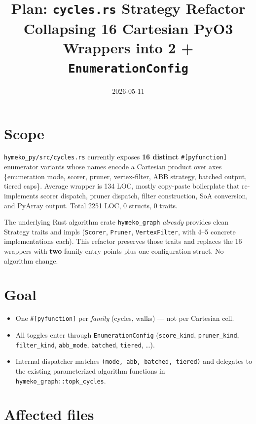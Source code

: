 \documentclass[11pt]{article}
\title{Plan: \texttt{cycles.rs} Strategy Refactor\\
  Collapsing 16 Cartesian PyO3 Wrappers into 2 + \texttt{EnumerationConfig}}
\author{}
\date{2026-05-11}
\begin{document}
\maketitle

\section{Scope}

\texttt{hymeko\_py/src/cycles.rs} currently exposes \textbf{16
distinct} \texttt{\#[pyfunction]} enumerator variants whose names
encode a Cartesian product over axes \{enumeration mode, scorer,
pruner, vertex-filter, ABB strategy, batched output, tiered caps\}.
Average wrapper is 134 LOC, mostly copy-paste boilerplate that
re-implements scorer dispatch, pruner dispatch, filter construction,
SoA conversion, and PyArray output.  Total 2251 LOC, 0 structs, 0
traits.

The underlying Rust algorithm crate \texttt{hymeko\_graph} \emph{already}
provides clean Strategy traits and impls
(\texttt{Scorer}, \texttt{Pruner}, \texttt{VertexFilter}, with 4--5
concrete implementations each).  This refactor preserves those traits
and replaces the 16 wrappers with \textbf{two} family entry points
plus one configuration struct.  No algorithm change.

\section{Goal}

\begin{itemize}
  \item One \texttt{\#[pyfunction]} per \emph{family}
    (cycles, walks) — not per Cartesian cell.
  \item All toggles enter through \texttt{EnumerationConfig}
    (\texttt{score\_kind}, \texttt{pruner\_kind}, \texttt{filter\_kind},
    \texttt{abb\_mode}, \texttt{batched}, \texttt{tiered}, \dots).
  \item Internal dispatcher matches \texttt{(mode, abb, batched, tiered)}
    and delegates to the existing parameterized algorithm functions
    in \texttt{hymeko\_graph::topk\_cycles}.
\end{itemize}

\section{Affected files}
\end{document}
